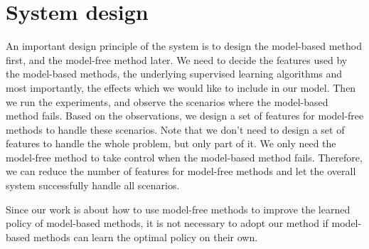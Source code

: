 

\section{System design}

An important design principle of the system is to design the model-based method first,
and the model-free method later. 
We need to decide the features used by the
model-based methods, the underlying supervised learning algorithms and most
importantly, the effects which we would like to include in our model. Then we
run the experiments, and observe the scenarios where the model-based method fails. 
Based on the observations, we design a set of features for model-free methods to handle
these scenarios. Note that we don't need to design a set of features to handle
the whole problem, but only part of it. We only need the model-free method
to take control when the model-based method fails. Therefore, we can reduce the
number of features for model-free methods and let the overall system
successfully handle all scenarios.


Since our work is about how to use model-free methods to improve the learned policy of model-based methods,
it is not necessary to adopt our method if model-based methods can learn the optimal policy
on their own.


